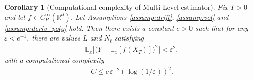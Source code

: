 \documentclass[11pt]{article}
\newtheorem{corollary}{Corollary}
\begin{document}

\begin{corollary}[Computational complexity of Multi-Level estimator] \label{cor:mlmc}
Fix $T >0$ and let $f \in C_P^\infty(\mathbb{R}^d)$.  
Let Assumptions \ref{assump:drift}, \ref{assump:vol} and \ref{assump:deriv_poly} hold. Then there exists a constant $c > 0$ such that for any $\varepsilon < e^{-1}$, there are values $L$ and $N_\ell$ satisfying 
\begin{align}
\mathbb{E}_x \bigl[ \bigl( Y - \mathbb{E}_x [f (X_T)] \bigr)^2 \bigr] < \varepsilon^2, 
\end{align}
with a computational complexity
\begin{align} \label{eq:cost_bd}
C \le c \, \varepsilon^{-2} ( \log  (1/\varepsilon) )^2.  
\end{align}
\end{corollary}
\end{document}
